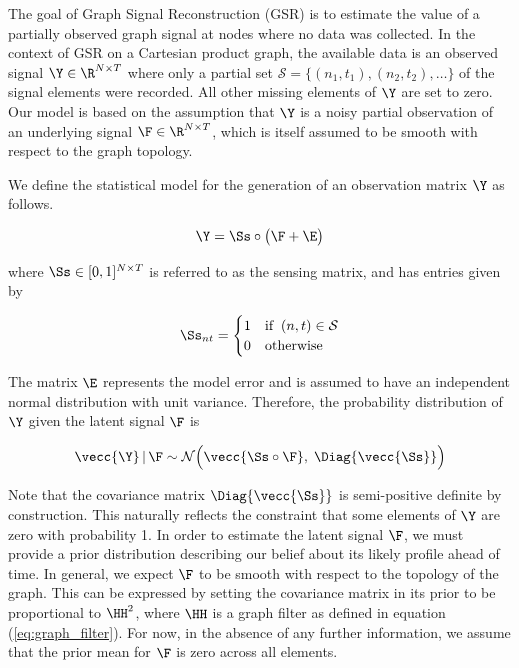 The goal of Graph Signal Reconstruction (GSR) is to estimate the value of a partially observed graph signal at nodes where no data was collected. In the context of GSR on a Cartesian product graph, the available data is an observed signal $\Y \in \R^{N \times T}$ where only a partial set $\mathcal{S} = \{(n_1, t_1), (n_2, t_2), \dots \}$ of the signal elements were recorded. All other missing elements of $\Y$ are set to zero. Our model is based on the assumption that $\Y$ is a noisy partial observation of an underlying signal $\F \in \R^{N \times T}$, which is itself assumed to be smooth with respect to the graph topology.

We define the statistical model for the generation of an observation matrix $\Y$ as follows. 

\begin{equation}
    \Y = \Ss \circ \big(\F + \E \big)
\end{equation}

where $\Ss \in [0, 1]^{N \times T}$ is referred to as the sensing matrix, and has entries given by

\begin{equation}
    \Ss_{nt} = \begin{cases}
        1 & \text{if} \;\; (n, t) \in \mathcal{S} \\
        0 & \text{otherwise}
    \end{cases}
\end{equation}

The matrix $\E$ represents the model error and is assumed to have an independent normal distribution with unit variance. Therefore, the probability distribution of $\Y$ given the latent signal $\F$ is

\begin{equation}
    \label{eq:Y_given_F}
    \vecc{\Y} \, | \, \F \sim \mathcal{N}\Big(\vecc{\Ss \circ \F}, \; \Diag{\vecc{\Ss}}\Big)
\end{equation}

Note that the covariance matrix $\Diag{\vecc{\Ss}}$ is semi-positive definite by construction. This naturally reflects the constraint that some elements of $\Y$ are zero with probability 1. In order to estimate the latent signal $\F$, we must provide a prior distribution describing our belief about its likely profile ahead of time. In general, we expect $\F$ to be smooth with respect to the topology of the graph. This can be expressed by setting the covariance matrix in its prior to be proportional to $\HH^2$, where $\HH$ is a graph filter as defined in equation (\ref{eq:graph_filter}). For now, in the absence of any further information, we assume that the prior mean for $\F$ is zero across all elements.

